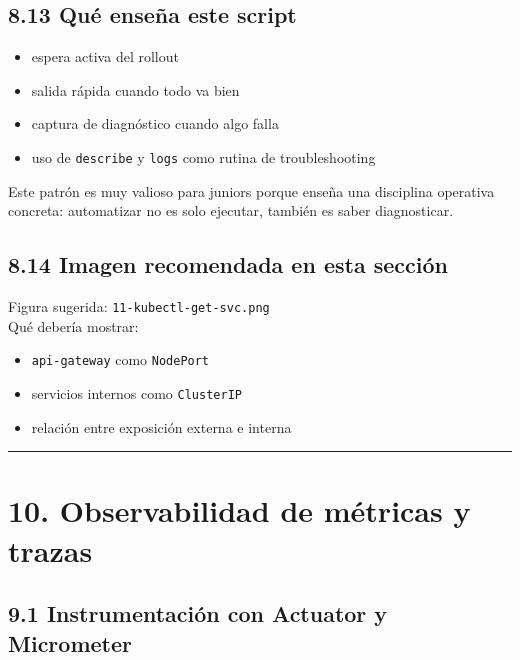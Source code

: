 \documentclass[
a4paper,
12pt]{report}
\providecommand{\tightlist}{%
  \setlength{\itemsep}{0pt}\setlength{\parskip}{0pt}}
\begin{document}
\section{8.13 Qué enseña este
script}\label{quuxe9-enseuxf1a-este-script}

\begin{itemize}
\tightlist
\item
  espera activa del rollout
\item
  salida rápida cuando todo va bien
\item
  captura de diagnóstico cuando algo falla
\item
  uso de \texttt{describe} y \texttt{logs} como rutina de
  troubleshooting
\end{itemize}

Este patrón es muy valioso para juniors porque enseña una disciplina
operativa concreta: automatizar no es solo ejecutar, también es saber
diagnosticar.

\section{8.14 Imagen recomendada en esta
sección}\label{imagen-recomendada-en-esta-secciuxf3n-2}

Figura sugerida: \texttt{11-kubectl-get-svc.png}\\
Qué debería mostrar:

\begin{itemize}
\tightlist
\item
  \texttt{api-gateway} como \texttt{NodePort}
\item
  servicios internos como \texttt{ClusterIP}
\item
  relación entre exposición externa e interna
\end{itemize}

\begin{center}\rule{0.5\linewidth}{0.5pt}\end{center}

\chapter{10. Observabilidad de métricas y
trazas}\label{observabilidad-de-muxe9tricas-y-trazas}

\section{9.1 Instrumentación con Actuator y
Micrometer}\label{instrumentaciuxf3n-con-actuator-y-micrometer}
\end{document}
